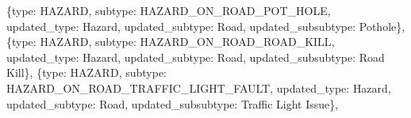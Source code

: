 \documentclass[
  letterpaper,
  DIV=11,
  numbers=noendperiod]{scrartcl}
\newenvironment{Shaded}{\begin{snugshade}}{\end{snugshade}}
\newcommand{\NormalTok}[1]{\textcolor[rgb]{0.00,0.23,0.31}{#1}}
\newcommand{\StringTok}[1]{\textcolor[rgb]{0.13,0.47,0.30}{#1}}
\begin{document}
\begin{Shaded}
\begin{Highlighting}[]
\NormalTok{    \{}\StringTok{\textquotesingle{}type\textquotesingle{}}\NormalTok{: }\StringTok{\textquotesingle{}HAZARD\textquotesingle{}}\NormalTok{, }\StringTok{\textquotesingle{}subtype\textquotesingle{}}\NormalTok{: }\StringTok{\textquotesingle{}HAZARD\_ON\_ROAD\_POT\_HOLE\textquotesingle{}}\NormalTok{, }
     \StringTok{\textquotesingle{}updated\_type\textquotesingle{}}\NormalTok{: }\StringTok{\textquotesingle{}Hazard\textquotesingle{}}\NormalTok{, }\StringTok{\textquotesingle{}updated\_subtype\textquotesingle{}}\NormalTok{: }\StringTok{\textquotesingle{}Road\textquotesingle{}}\NormalTok{, }\StringTok{\textquotesingle{}updated\_subsubtype\textquotesingle{}}\NormalTok{: }\StringTok{\textquotesingle{}Pothole\textquotesingle{}}\NormalTok{\},}
\NormalTok{    \{}\StringTok{\textquotesingle{}type\textquotesingle{}}\NormalTok{: }\StringTok{\textquotesingle{}HAZARD\textquotesingle{}}\NormalTok{, }\StringTok{\textquotesingle{}subtype\textquotesingle{}}\NormalTok{: }\StringTok{\textquotesingle{}HAZARD\_ON\_ROAD\_ROAD\_KILL\textquotesingle{}}\NormalTok{, }
     \StringTok{\textquotesingle{}updated\_type\textquotesingle{}}\NormalTok{: }\StringTok{\textquotesingle{}Hazard\textquotesingle{}}\NormalTok{, }\StringTok{\textquotesingle{}updated\_subtype\textquotesingle{}}\NormalTok{: }\StringTok{\textquotesingle{}Road\textquotesingle{}}\NormalTok{, }\StringTok{\textquotesingle{}updated\_subsubtype\textquotesingle{}}\NormalTok{: }\StringTok{\textquotesingle{}Road Kill\textquotesingle{}}\NormalTok{\},}
\NormalTok{    \{}\StringTok{\textquotesingle{}type\textquotesingle{}}\NormalTok{: }\StringTok{\textquotesingle{}HAZARD\textquotesingle{}}\NormalTok{, }\StringTok{\textquotesingle{}subtype\textquotesingle{}}\NormalTok{: }\StringTok{\textquotesingle{}HAZARD\_ON\_ROAD\_TRAFFIC\_LIGHT\_FAULT\textquotesingle{}}\NormalTok{, }
     \StringTok{\textquotesingle{}updated\_type\textquotesingle{}}\NormalTok{: }\StringTok{\textquotesingle{}Hazard\textquotesingle{}}\NormalTok{, }\StringTok{\textquotesingle{}updated\_subtype\textquotesingle{}}\NormalTok{: }\StringTok{\textquotesingle{}Road\textquotesingle{}}\NormalTok{, }\StringTok{\textquotesingle{}updated\_subsubtype\textquotesingle{}}\NormalTok{: }\StringTok{\textquotesingle{}Traffic Light Issue\textquotesingle{}}\NormalTok{\},}
    

\end{Highlighting}
\end{Shaded}
\end{document}
